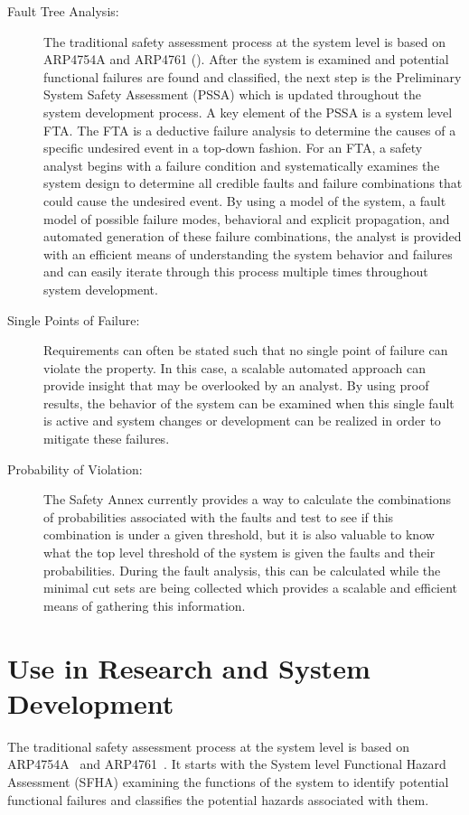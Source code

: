 \begin{description}
\item [Fault Tree Analysis:] The traditional safety assessment process at the system level is based on ARP4754A and ARP4761 (). After the system is examined and potential functional failures are found and classified, the next step is the Preliminary System Safety Assessment (PSSA) which is updated throughout the system development process. A key element of the PSSA is a system level FTA. The FTA is a deductive failure analysis to determine the causes of a specific undesired event in a top-down fashion. For an FTA, a safety analyst begins with a failure condition and systematically examines the system design to determine all credible faults and failure combinations that could cause the undesired event. By using a model of the system, a fault model of possible failure modes, behavioral and explicit propagation, and automated generation of these failure combinations, the analyst is provided with an efficient means of understanding the system behavior and failures and can easily iterate through this process multiple times throughout system development.  
\item [Single Points of Failure:] Requirements can often be stated such that no single point of failure can violate the property. In this case, a scalable automated approach can provide insight that may be overlooked by an analyst. By using proof results, the behavior of the system can be examined when this single fault is active and system changes or development can be realized in order to mitigate these failures. 
\item [Probability of Violation:] The Safety Annex currently provides a way to calculate the combinations of probabilities associated with the faults and test to see if this combination is under a given threshold, but it is also valuable to know what the top level threshold of the system is given the faults and their probabilities. During the fault analysis, this can be calculated while the minimal cut sets are being collected which provides a scalable and efficient means of gathering this information.
\end{description}

\section{Use in Research and System Development}
The traditional safety assessment process at the system level is based on ARP4754A~\cite{SAE:ARP4754A} and ARP4761~\cite{SAE:ARP4761}. It starts with the System level Functional Hazard Assessment (SFHA) examining the functions of the system to identify potential functional failures and classifies the potential hazards associated with them. 

